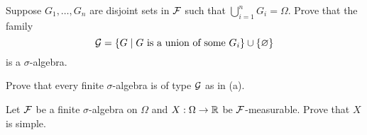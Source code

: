 \begin{exercise}{2.7}\label{ex:2.7}$ $\vspace{-1.5em}
    \begin{thmenum}
        \item Suppose $G_1,\ldots,G_n$ are disjoint sets in $\mathcal{F}$ such that $\bigcup_{i=1}^n G_i = \Omega$.
        Prove that the family 
        \begin{equation*}
            \mathcal{G} = \left\{ G \;\middle\vert\; \text{$G$ is a union of some $G_i$} \right\}\cup\left\{ {\varnothing} \right\}
        \end{equation*}
        is a $\sigma$-algebra.
        \item Prove that every finite $\sigma$-algebra is of type $\mathcal{G}$ as in (a).
        \item Let $\mathcal{F}$ be a finite $\sigma$-algebra on $\Omega$ and $X:\Omega\to\mathbb{R}$ 
        be $\mathcal{F}$-measurable. Prove that $X$ is simple. 
    \end{thmenum}
\end{exercise}
